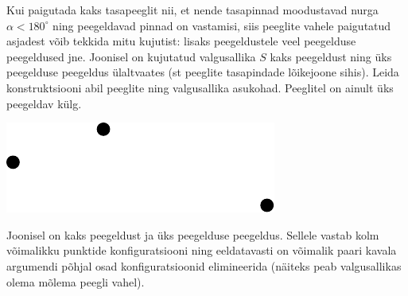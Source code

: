 
Kui paigutada kaks tasapeeglit nii, et nende tasapinnad moodustavad nurga $\alpha<180^\circ$ ning peegeldavad pinnad on vastamisi, siis peeglite vahele paigutatud asjadest võib tekkida mitu kujutist: lisaks peegeldustele veel peegelduse peegeldused jne. Joonisel on kujutatud valgusallika $S$ kaks peegeldust ning üks peegelduse peegeldus ülaltvaates (st peeglite tasapindade lõikejoone sihis). Leida konstruktsiooni abil peeglite ning valgusallika asukohad. Peeglitel on ainult üks peegeldav külg.\\

\begin{center}
	\includegraphics[width=0.6\linewidth]{2009-v2g-08-yl}
\end{center}

\hint
Joonisel on kaks peegeldust ja üks peegelduse peegeldus. Sellele vastab kolm võimalikku punktide konfiguratsiooni ning eeldatavasti on võimalik paari kavala argumendi põhjal osad konfiguratsioonid elimineerida (näiteks peab valgusallikas olema mõlema peegli vahel).

